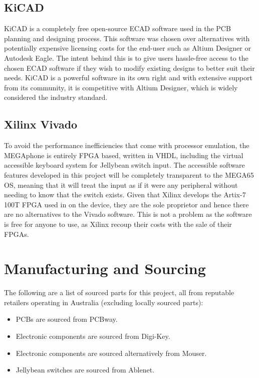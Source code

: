 \subsection{KiCAD} \label{KiCAD}

KiCAD is a completely free open-source ECAD software used in the PCB planning and designing process.
This software was chosen over alternatives with potentially expensive licensing costs for the end-user such as Altium Designer or Autodesk Eagle.
The intent behind this is to give users hassle-free access to the chosen ECAD software if they wish to modify existing designs to better suit their needs.
KiCAD is a powerful software in its own right and with extensive support from its community, it is competitive with Altium Designer, which is widely considered the industry standard.


\subsection{Xilinx Vivado}

To avoid the performance inefficiencies that come with processor emulation, the MEGAphone is entirely FPGA based, written in VHDL, including the virtual accessible keyboard system for Jellybean switch input.
The accessible software features developed in this project will be completely transparent to the MEGA65 OS, meaning that it will treat the input as if it were any peripheral without needing to know that the switch exists.
Given that Xilinx develops the Artix-7 100T FPGA used in on the device, they are the sole proprietor and hence there are no alternatives to the Vivado software.
This is not a problem as the software is free for anyone to use, as Xilinx recoup their costs with the sale of their FPGAs.

\section{Manufacturing and Sourcing}

The following are a list of sourced parts for this project, all from reputable retailers operating in Australia (excluding locally sourced parts):

\begin{itemize} 
    \item PCBs are sourced from PCBway.
    \item Electronic components are sourced from Digi-Key.
    \item Electronic components are sourced alternatively from Mouser.
    \item Jellybean switches are sourced from Ablenet.
    \end{itemize}


